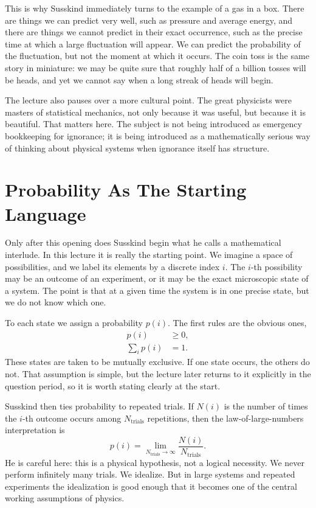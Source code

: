 This is why Susskind immediately turns to the example of a gas in a box. There are things we can predict very well, such as pressure and average energy, and there are things we cannot predict in their exact occurrence, such as the precise time at which a large fluctuation will appear. We can predict the probability of the fluctuation, but not the moment at which it occurs. The coin toss is the same story in miniature: we may be quite sure that roughly half of a billion tosses will be heads, and yet we cannot say when a long streak of heads will begin.

The lecture also pauses over a more cultural point. The great physicists were masters of statistical mechanics, not only because it was useful, but because it is beautiful. That matters here. The subject is not being introduced as emergency bookkeeping for ignorance; it is being introduced as a mathematically serious way of thinking about physical systems when ignorance itself has structure.

\section{Probability As The Starting Language}

Only after this opening does Susskind begin what he calls a mathematical interlude. In this lecture it is really the starting point. We imagine a space of possibilities, and we label its elements by a discrete index \(i\). The \(i\)-th possibility may be an outcome of an experiment, or it may be the exact microscopic state of a system. The point is that at a given time the system is in one precise state, but we do not know which one.

To each state we assign a probability \(p(i)\). The first rules are the obvious ones,
\begin{align}
p(i) &\ge 0, \\
\sum_i p(i) &= 1.
\end{align}
These states are taken to be mutually exclusive. If one state occurs, the others do not. That assumption is simple, but the lecture later returns to it explicitly in the question period, so it is worth stating clearly at the start.

Susskind then ties probability to repeated trials. If \(N(i)\) is the number of times the \(i\)-th outcome occurs among \(N_{\text{trials}}\) repetitions, then the law-of-large-numbers interpretation is
\begin{equation}
p(i)=\lim_{N_{\text{trials}}\to\infty}\frac{N(i)}{N_{\text{trials}}}.
\end{equation}
He is careful here: this is a physical hypothesis, not a logical necessity. We never perform infinitely many trials. We idealize. But in large systems and repeated experiments the idealization is good enough that it becomes one of the central working assumptions of physics.

